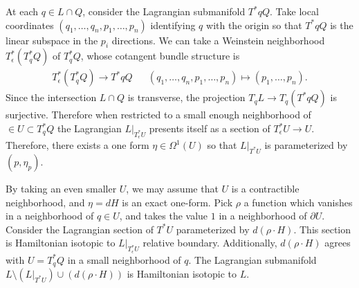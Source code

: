 

    At each $q\in L\cap Q$, consider the Lagrangian submanifold $T^*qQ$. 
    Take local coordinates $(q_1, \ldots, q_n, p_1, \ldots, p_n)$ identifying $q$ with the origin so that $T^*qQ$ is the linear subspace in the $p_i$ directions.
    We can take a Weinstein neighborhood $T^*_\epsilon(T^*_qQ)$ of $T^*_qQ$, whose cotangent bundle structure is 
    \begin{align*}
        T^*_\epsilon(T^*_qQ)\to T^*qQ && (q_1, \ldots, q_n, p_1, \ldots, p_n)\mapsto (p_1, \ldots, p_n).
    \end{align*}
    Since the intersection $L\cap Q$ is transverse, the projection $T_qL\to T_q(T^*qQ)$ is surjective. Therefore when restricted to a small enough neighborhood of $\in U\subset T^*_qQ$  the Lagrangian $L|_{T^*_\epsilon U}$ presents itself as a section of $T^*_\epsilon U\to U$. 
    Therefore, there exists a one form $\eta\in \Omega^1(U)$ so that $L|_{T^*U}$ is parameterized by $(p, \eta_p)$.

    By taking an even smaller $U$, we may assume that $U$ is a contractible neighborhood, and $\eta=dH$ is an exact one-form.
    Pick $\rho$ a function which vanishes in a neighborhood of $q\in U$, and takes the value $1$ in a neighborhood of $\partial U$. 
    Consider the Lagrangian section of $T^*U$ parameterized by $d(\rho \cdot H)$.
    This section is Hamiltonian isotopic to $L|_{T^*_\epsilon U}$ relative boundary.
    Additionally, $d(\rho\cdot H)$ agrees with $U=T^*_qQ$ in a small neighborhood of $q$.
    The Lagrangian submanifold $L\setminus (L|_{T^*U})\cup (d(\rho\cdot H))$ is Hamiltonian isotopic to $L$. 

